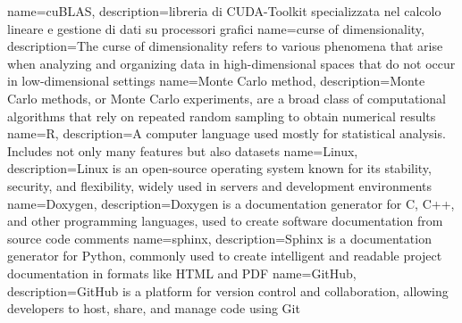 {
    name=cuBLAS,
    description={libreria di CUDA-Toolkit specializzata nel calcolo lineare e gestione di dati su processori grafici}
}
{
name=curse of dimensionality,
description={The curse of dimensionality refers to various phenomena that arise when analyzing and organizing data in high-dimensional spaces that do not occur in low-dimensional settings}
}
{
	name=Monte Carlo method,
	description={Monte Carlo methods, or Monte Carlo experiments, are a broad class of computational algorithms that rely on repeated random sampling to obtain numerical results}
}
{
name=R,
description={A computer language used mostly for statistical analysis. Includes not only many features but also datasets}
}
{
name=Linux,
description={Linux is an open-source operating system known for its stability, security, and flexibility, widely used in servers and development environments}
}
{
name=Doxygen,
description={Doxygen is a documentation generator for C, C++, and other programming languages, used to create software documentation from source code comments}
}
{
name=sphinx,
description={Sphinx is a documentation generator for Python, commonly used to create intelligent and readable project documentation in formats like HTML and PDF}
}
{
name=GitHub,
description={GitHub is a platform for version control and collaboration, allowing developers to host, share, and manage code using Git}
}





